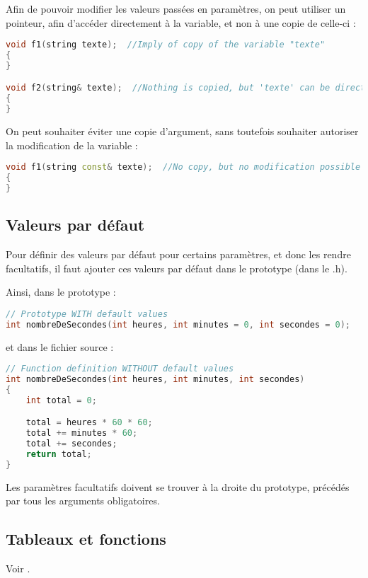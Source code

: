 \documentclass[a4paper,twoside]{article}
\begin{document}
Afin de pouvoir modifier les valeurs passées en paramètres, on peut utiliser un pointeur, afin d'accéder directement à la 
variable, et non à une copie de celle-ci : 
\begin{lstlisting}[language=C++]
void f1(string texte);  //Imply of copy of the variable "texte"
{
}

void f2(string& texte);  //Nothing is copied, but 'texte' can be directly modified
{
}
\end{lstlisting}

On peut souhaiter éviter une copie d'argument, sans toutefois souhaiter autoriser la modification de la variable :
\begin{lstlisting}[language=C++]
void f1(string const& texte);  //No copy, but no modification possible
{
}
\end{lstlisting}

\subsection{Valeurs par défaut}
Pour définir des valeurs par défaut pour certains paramètres, et donc les rendre facultatifs, il faut ajouter ces valeurs par 
défaut dans le prototype (dans le .h). 

Ainsi, dans le prototype : 
\begin{lstlisting}[language=C++]
// Prototype WITH default values
int nombreDeSecondes(int heures, int minutes = 0, int secondes = 0);
\end{lstlisting}

et dans le fichier source :
\begin{lstlisting}[language=C++]
// Function definition WITHOUT default values
int nombreDeSecondes(int heures, int minutes, int secondes)
{
    int total = 0;

    total = heures * 60 * 60;
    total += minutes * 60;
    total += secondes;
    return total;
}
\end{lstlisting}

\begin{remarque}
Les paramètres facultatifs doivent se trouver à la droite du prototype, précédés par tous les arguments obligatoires.
\end{remarque}

\subsection{Tableaux et fonctions}
Voir .
\end{document}
